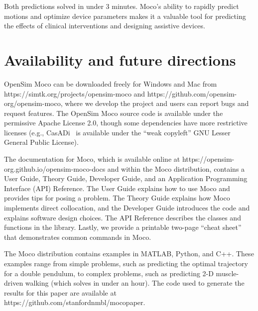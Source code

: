\documentclass[10pt,letterpaper]{article}
\begin{document}
Both predictions solved in under 3 minutes. Moco’s ability to rapidly predict motions and optimize device parameters makes it a valuable tool for predicting the effects of clinical interventions and designing assistive devices.


\section*{Availability and future directions}

OpenSim Moco can be downloaded freely for Windows and Mac from https://simtk.org/projects/opensim-moco and https://github.com/opensim-org/opensim-moco, where we develop the project and users can report bugs and request features. The OpenSim Moco source code is available under the permissive Apache License 2.0, though some dependencies have more restrictive licenses (e.g., CasADi~\cite{Andersson:2019} is available under the “weak copyleft” GNU Lesser General Public License).

The documentation for Moco, which is available online at https://opensim-org.github.io/opensim-moco-docs and within the Moco distribution, contains a User Guide, Theory Guide, Developer Guide, and an Application Programming Interface (API) Reference. The User Guide explains how to use Moco and provides tips for posing a problem. The Theory Guide explains how Moco implements direct collocation, and the Developer Guide introduces the code and explains software design choices. The API Reference describes the classes and functions in the library. Lastly, we provide a printable two-page “cheat sheet” that demonstrates common commands in Moco.

The Moco distribution contains examples in MATLAB, Python, and C++. These examples range from simple problems, such as predicting the optimal trajectory for a double pendulum, to complex problems, such as predicting 2-D muscle-driven walking (which solves in under an hour). The code used to generate the results for this paper are available at https://github.com/stanfordnmbl/mocopaper.
\end{document}
